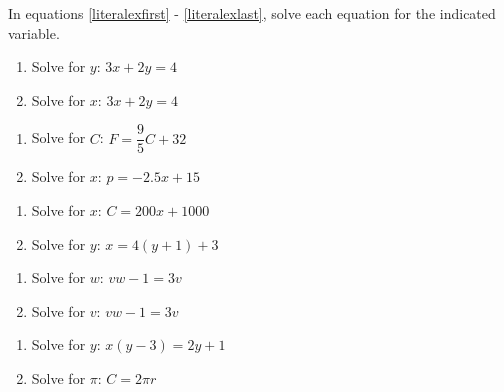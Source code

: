\documentclass{ximera}
\begin{document}
In equations \ref{literalexfirst} - \ref{literalexlast}, solve each equation for the indicated variable.

\begin{multicols}{2}
\begin{enumerate}
\setcounter{enumi}{\value{HW}}
\item  Solve for $y$:  $3x+2y = 4$  \label{literalexfirst}
\item  Solve for $x$:  $3x+2y = 4$ 
\setcounter{HW}{\value{enumi}}
\end{enumerate}
\end{multicols}

\begin{multicols}{2}
\begin{enumerate}
\setcounter{enumi}{\value{HW}}
\item  Solve for $C$: $F = \dfrac{9}{5} C + 32$
\item  Solve for $x$:  $p = -2.5x + 15$ 
\setcounter{HW}{\value{enumi}}
\end{enumerate}
\end{multicols}

\begin{multicols}{2}
\begin{enumerate}
\setcounter{enumi}{\value{HW}}
\item  Solve for $x$: $C = 200x + 1000$ 
\item  Solve for $y$:  $x= 4(y+1) + 3$ 
\setcounter{HW}{\value{enumi}}
\end{enumerate}
\end{multicols}


\begin{multicols}{2}
\begin{enumerate}
\setcounter{enumi}{\value{HW}}
\item  Solve for $w$:  $vw - 1 = 3v$ 
\item  Solve for $v$:   $vw - 1 = 3v$
\setcounter{HW}{\value{enumi}}
\end{enumerate}
\end{multicols}

\begin{multicols}{2}
\begin{enumerate}
\setcounter{enumi}{\value{HW}}
\item Solve for $y$:  $x(y-3) = 2y+1$
\item Solve for $\pi$:  $C = 2\pi r$


\setcounter{HW}{\value{enumi}}
\end{enumerate}
\end{multicols}
\end{document}

